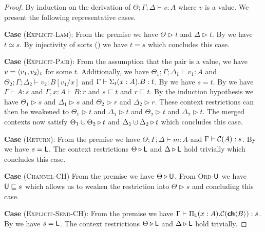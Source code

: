 \begin{proof}
  By induction on the derivation of ${\Theta ; \Gamma ; \Delta \vdash v : A}$ where $v$ is a value.
  We present the following representative cases.

\textbf{Case} (\textsc{Explicit-Lam}):
  From the premise we have $\Theta \triangleright t$ and $\Delta \triangleright t$.
  By  we have $t \simeq s$.
  By injectivity of sorts () we have $t = s$ which concludes this case.

\textbf{Case} (\textsc{Explicit-Pair}):
  From the assumption that the pair is a value, we have $v = \langle{{v_1},{v_2}}\rangle_{t}$ for some $t$.
  Additionally, we have $\Theta_1 ; \Gamma ; \Delta_1 \vdash v_1 : A$ and 
  $\Theta_2 ; \Gamma ; \Delta_2 \vdash v_2 : B[v_1/x]$ and $\Gamma \vdash \Sigma_{t}({x : A}).{B} : t$.
  By  we have $s = t$.
  By  we have 
  $\Gamma \vdash A : s$ and $\Gamma, x : A \vdash B : r$ and $s \sqsubseteq t$ and $r \sqsubseteq t$.
  By the induction hypothesis we have $\Theta_1 \triangleright s$ and $\Delta_1 \triangleright s$
  and $\Theta_2 \triangleright r$ and $\Delta_2 \triangleright r$.
  These context restrictions can then be weakened to $\Theta_1 \triangleright t$ and $\Delta_1 \triangleright t$ 
  and $\Theta_2 \triangleright t$ and $\Delta_2 \triangleright t$.
  The merged contexts now satisfy $\Theta_1 \dotcup \Theta_2 \triangleright t$ and 
  $\Delta_1 \dotcup \Delta_2 \triangleright t$ which concludes this case.

\textbf{Case} (\textsc{Return}):
  From the premise we have $\Theta ; \Gamma ; \Delta \vdash m : A$ and $\Gamma \vdash \mathcal{C}({A}) : s$.
  By  we have $s = \textsf{L}$. 
  The context restrictions $\Theta \triangleright \textsf{L}$ and $\Delta \triangleright \textsf{L}$ hold trivially which concludes this case.

\textbf{Case} (\textsc{Channel-CH})
  From the premise we have $\Theta \triangleright \textsf{U}$. From \textsc{Ord-$\textsf{U}$} we have $\textsf{U} \sqsubseteq s$
  which allows us to weaken the restriction into $\Theta \triangleright s$ and concluding this case.

\textbf{Case} (\textsc{Explicit-Send-CH}):
  From the premise we have $\Gamma \vdash \Pi_{\textsf{L}}({x : A}).{\mathcal{C}({{\textbf{\textsf{ch}}\langle{B}\rangle}})} : s$. 
  By  we have $s = \textsf{L}$.
  The context restrictions $\Theta \triangleright \textsf{L}$ and $\Delta \triangleright \textsf{L}$ hold trivially.
\end{proof}

